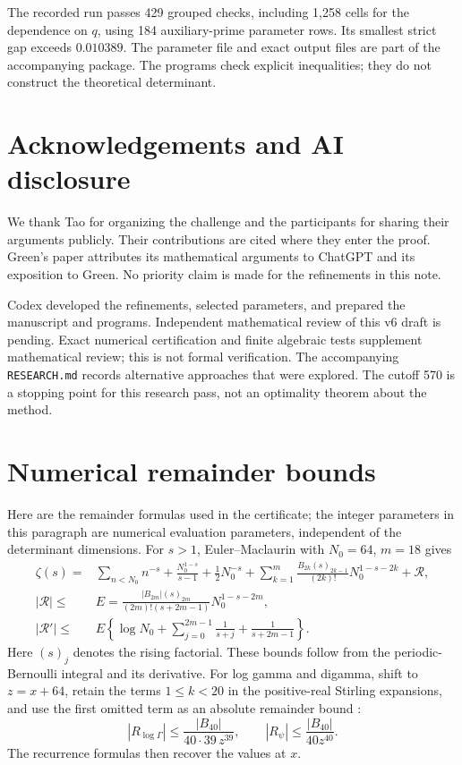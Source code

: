 \documentclass[11pt]{article}
\begin{document}
The recorded run passes 429 grouped checks, including 1,258 cells
for the dependence on \(q\), using 184 auxiliary-prime parameter
rows. Its smallest strict gap exceeds \(0.010389\).
The parameter file and exact output files are part of the accompanying
package. The programs check explicit inequalities; they do not
construct the theoretical determinant.

\section*{Acknowledgements and AI disclosure}
We thank Tao for organizing the challenge and the participants for
sharing their arguments publicly. Their contributions are cited where
they enter the proof. Green's paper attributes its mathematical
arguments to ChatGPT and its exposition to Green. No priority claim
is made for the refinements in this note.

Codex developed the refinements, selected parameters, and prepared the
manuscript and programs. Independent mathematical review of this v6
draft is pending. Exact numerical certification and finite algebraic
tests supplement mathematical review; this is not formal verification.
The accompanying \texttt{RESEARCH.md} records alternative approaches
that were explored. The cutoff 570 is a stopping point for this
research pass, not an optimality theorem about the method.

\appendix
\section{Numerical remainder bounds}\label{remainders}
Here are the remainder formulas used in the certificate; the integer
parameters in this paragraph are numerical evaluation parameters,
independent of the determinant dimensions.
For \(s>1\), Euler--Maclaurin with \(N_0=64\), \(m=18\) gives
\begin{align*}
 \zeta(s)={}&\sum_{n<N_0}n^{-s}+\frac{N_0^{1-s}}{s-1}
      +\frac12N_0^{-s}
      +\sum_{k=1}^{m}\frac{B_{2k}(s)_{2k-1}}{(2k)!}
                      N_0^{1-s-2k}+\mathcal R,\\
 |\mathcal R|\le{}&E=
 \frac{|B_{2m}|(s)_{2m}}{(2m)!(s+2m-1)}N_0^{1-s-2m},\\
 |\mathcal R'|\le{}&E\left\{\log N_0+
       \sum_{j=0}^{2m-1}\frac1{s+j}+\frac1{s+2m-1}\right\}.
\end{align*}
Here \((s)_j\) denotes the rising factorial. These bounds follow
from the periodic-Bernoulli integral and its derivative.
For log gamma and digamma, shift to \(z=x+64\), retain the terms
\(1\le k<20\) in the positive-real Stirling expansions, and use
the first omitted term as an absolute remainder bound
\cite{dlmf}:
\[
 |R_{\log\Gamma}|\le\frac{|B_{40}|}{40\cdot39\,z^{39}},
 \qquad |R_\psi|\le\frac{|B_{40}|}{40z^{40}}.
\]
The recurrence formulas then recover the values at \(x\).
\end{document}
